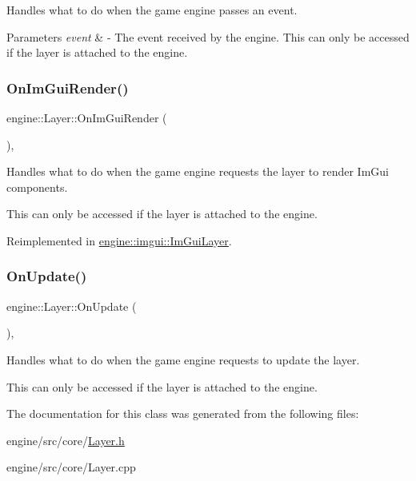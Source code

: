 Handles what to do when the game engine passes an event. 


\begin{DoxyParams}{Parameters}
{\em event} & -\/ The event received by the engine. This can only be accessed if the layer is attached to the engine. \\
\hline
\end{DoxyParams}
\mbox{\label{classengine_1_1Layer_a002df9fddaba135a8bd7abc14e3fb067}} 
\subsubsection{\texorpdfstring{On\+Im\+Gui\+Render()}{OnImGuiRender()}}
{\footnotesize\ttfamily engine\+::\+Layer\+::\+On\+Im\+Gui\+Render (\begin{DoxyParamCaption}{ }\end{DoxyParamCaption})\hspace{0.3cm}{\ttfamily [inline]}, {\ttfamily [virtual]}}



Handles what to do when the game engine requests the layer to render Im\+Gui components. 

This can only be accessed if the layer is attached to the engine. 

Reimplemented in \hyperlink{classengine_1_1imgui_1_1ImGuiLayer_aeacc4aecfc119192fbe98e961b88813e}{engine\+::imgui\+::\+Im\+Gui\+Layer}.

\mbox{\label{classengine_1_1Layer_a449eaba4fc30454d281419173bd6624b}} 
\subsubsection{\texorpdfstring{On\+Update()}{OnUpdate()}}
{\footnotesize\ttfamily engine\+::\+Layer\+::\+On\+Update (\begin{DoxyParamCaption}{ }\end{DoxyParamCaption})\hspace{0.3cm}{\ttfamily [inline]}, {\ttfamily [virtual]}}



Handles what to do when the game engine requests to update the layer. 

This can only be accessed if the layer is attached to the engine. 

The documentation for this class was generated from the following files\+:\begin{DoxyCompactItemize}
\item 
engine/src/core/\hyperlink{Layer_8h}{Layer.\+h}\item 
engine/src/core/Layer.\+cpp\end{DoxyCompactItemize}
